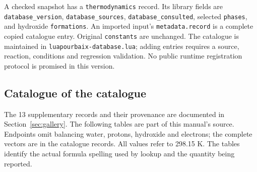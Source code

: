 \documentclass[a4paper,11pt]{ltxdoc}
\begin{document}
A checked snapshot has a \texttt{thermodynamics} record. Its library fields are
\texttt{database\_version}, \texttt{database\_sources},
\texttt{database\_consulted}, selected \texttt{phases}, and hydroxide
\texttt{formations}. An imported input's \texttt{metadata.record}
is a complete copied catalogue entry. Original \texttt{constants} are unchanged.
The catalogue is maintained in \texttt{luapourbaix-database.lua}; adding
entries requires a source, reaction, conditions and regression validation.
No public runtime registration protocol is promised in this version.

\subsection{Catalogue of the catalogue}
The 13 supplementary records and their provenance are documented in
Section~\ref{sec:gallery}.
The following tables are part of this manual's source. Endpoints omit balancing
water, protons, hydroxide and electrons; the complete vectors are in the
catalogue records. All values refer to 298.15 K. The tables identify the actual
formula spelling used by lookup and the quantity being reported.
\end{document}
